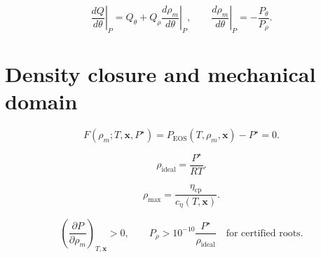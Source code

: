 \documentclass[11pt]{article}
\begin{document}
\begin{equation}
\left.\frac{dQ}{d\theta}\right|_{P}
=Q_\theta+Q_\rho\left.\frac{d\rho_m}{d\theta}\right|_P,
\qquad
\left.\frac{d\rho_m}{d\theta}\right|_P=-\frac{P_\theta}{P_\rho}.
\label{eq:fixed_pressure_total_derivative}
\end{equation}

\section{Density closure and mechanical domain}

\begin{equation}
F(\rho_m;T,\boldsymbol{x},P^\star)
=P_{\mathrm{EOS}}(T,\rho_m,\boldsymbol{x})-P^\star=0.
\label{eq:density_residual}
\end{equation}

\begin{equation}
\rho_{\mathrm{ideal}}=\frac{P^\star}{RT}.
\label{eq:ideal_gas_density}
\end{equation}

\begin{equation}
\rho_{\max}=\frac{\eta_{\mathrm{cp}}}{c_\eta(T,\boldsymbol{x})}.
\label{eq:density_upper_bound}
\end{equation}

\begin{equation}
\left(\frac{\partial P}{\partial\rho_m}\right)_{T,\boldsymbol{x}}>0,
\qquad
P_\rho>10^{-10}\frac{P^\star}{\rho_{\mathrm{ideal}}}
\quad\text{for certified roots}.
\label{eq:mechanical_stability}
\end{equation}
\end{document}
